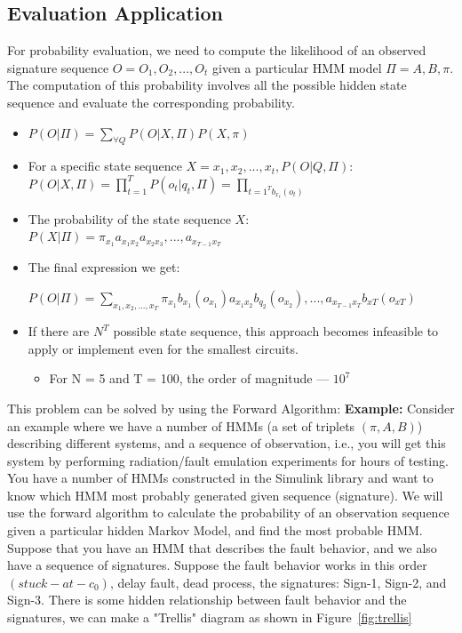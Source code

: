 \subsection{Evaluation Application}
For probability evaluation, we need to compute the likelihood of an observed signature sequence $O = {O_1, O_2,...,O_t}$ given a particular HMM model $ \Pi = {A, B, \pi}$. The computation of this probability involves all the possible hidden state sequence and evaluate the corresponding probability. 
\begin{itemize}
\item  $P(O | \Pi) = \sum\limits_{\forall Q}^{} P (O | X, \Pi) P (X, \pi)$ 
\item For a specific state sequence $X = {x_1, x_2,...,x_t}, P(O | Q, \Pi):$
 \hspace {0.2cm} $P (O | X, \Pi) = \prod_{t=1}^{T} P (o_t | q_t, \Pi) = \prod_{t=1^{T} b_{x_t} (o_t)}$
 
 \item The probability of the state sequence $X$:
 \\
 \hspace {0.2cm} $ P (X | \Pi ) = \pi_{x_1} a_{x_1 x_2} a_{x_2 x_3},...,a_{x_{T-1} x_T}$
 
 \item The final expression we get:
 
$P (O | \Pi ) = \sum\limits_{x_1, x_2,..., x_T} \pi_{x_1} b_{x_1} (o_{x_1}) a_{x_1 x_2} b_{q_2} (o_{x_2}),..., a_{x_{T-1} x_T} b_{xT} (o_{xT})$
\item If there are $N^T$ possible state sequence, this approach becomes infeasible to apply or implement even for the smallest circuits.
\begin{itemize}
\item For N = 5 and T = 100, the order of magnitude --- $10^7$
\end{itemize}
 
\end{itemize}
This problem can be solved by using the Forward Algorithm:
\textbf{Example:} Consider an example where we have a number of HMMs (a set of triplets $(\pi, A, B)$) describing different systems, and a sequence of observation, i.e., you will get this system by performing radiation/fault emulation experiments for hours of testing. You have a number of HMMs constructed in the Simulink library and want to know which HMM most probably generated given sequence (signature).
We will use the forward algorithm to calculate the probability of an observation sequence given a particular hidden Markov Model, and find the most probable HMM. Suppose that you have an HMM that describes the fault behavior, and we also have a sequence of signatures. Suppose the fault behavior works in this order $(stuck-at-c_0)$, delay fault, dead process, the signatures: Sign-1, Sign-2, and Sign-3. There is some hidden relationship between fault behavior and the signatures, we can make a "Trellis" diagram as shown in Figure~\ref{fig:trellis}
